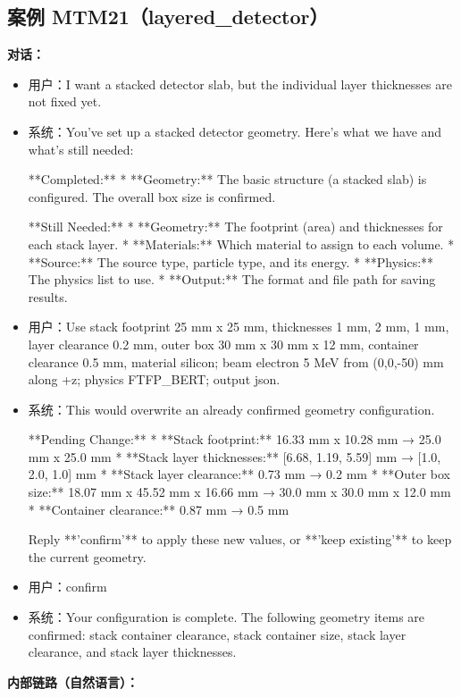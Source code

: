 \documentclass[11pt]{ctexart}
\begin{document}
\subsection{案例 MTM21（layered\_detector）}
\textbf{对话：}
\begin{itemize}
\item 用户：I want a stacked detector slab, but the individual layer thicknesses are not fixed yet.
\item 系统：You've set up a stacked detector geometry. Here's what we have and what's still needed:

**Completed:**
*   **Geometry:** The basic structure (a stacked slab) is configured. The overall box size is confirmed.

**Still Needed:**
*   **Geometry:** The footprint (area) and thicknesses for each stack layer.
*   **Materials:** Which material to assign to each volume.
*   **Source:** The source type, particle type, and its energy.
*   **Physics:** The physics list to use.
*   **Output:** The format and file path for saving results.
\item 用户：Use stack footprint 25 mm x 25 mm, thicknesses 1 mm, 2 mm, 1 mm, layer clearance 0.2 mm, outer box 30 mm x 30 mm x 12 mm, container clearance 0.5 mm, material silicon; beam electron 5 MeV from (0,0,-50) mm along +z; physics FTFP\_BERT; output json.
\item 系统：This would overwrite an already confirmed geometry configuration.

**Pending Change:**
*   **Stack footprint:** 16.33 mm x 10.28 mm → 25.0 mm x 25.0 mm
*   **Stack layer thicknesses:** [6.68, 1.19, 5.59] mm → [1.0, 2.0, 1.0] mm
*   **Stack layer clearance:** 0.73 mm → 0.2 mm
*   **Outer box size:** 18.07 mm x 45.52 mm x 16.66 mm → 30.0 mm x 30.0 mm x 12.0 mm
*   **Container clearance:** 0.87 mm → 0.5 mm

Reply **'confirm'** to apply these new values, or **'keep existing'** to keep the current geometry.
\item 用户：confirm
\item 系统：Your configuration is complete. The following geometry items are confirmed: stack container clearance, stack container size, stack layer clearance, and stack layer thicknesses.
\end{itemize}
\textbf{内部链路（自然语言）：}
\end{document}
